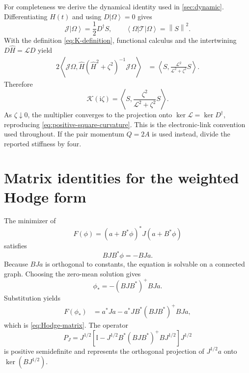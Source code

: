 \documentclass[11pt]{article}
\theoremstyle{definition}
\theoremstyle{remark}
\newcommand{\ket}[1]{\left|#1\right\rangle}
\newcommand{\bra}[1]{\left\langle#1\right|}
\newcommand{\I}{\mathrm i}
\newcommand{\Id}{\mathbb I}
\newcommand{\cL}{\mathcal L}
\newcommand{\cK}{\mathcal K}
\newcommand{\ip}[2]{\left\langle #1,#2\right\rangle}
\newcommand{\norm}[1]{\left\lVert #1\right\rVert}
\begin{document}
For completeness we derive the dynamical identity used in \cref{sec:dynamic}.  Differentiating $H(t)$ and using $D\ket\Omega=0$ gives
\begin{equation}
 \mathcal J\ket\Omega=\frac12D^\dagger S,
 \qquad
 \bra\Omega\mathcal T\ket\Omega=\norm S^2.
 \label{eq:positive-square-current-stress}
\end{equation}
With the definition \eqref{eq:K-definition}, functional calculus and the intertwining $D\widehat H=\cL D$ yield
\begin{align}
 2\ip{\mathcal J\Omega}
 {\widehat H(\widehat H^2+\zeta^2)^{-1}\mathcal J\Omega}
 &=\ip S{\frac{\cL^2}{\cL^2+\zeta^2}S}.
\end{align}
Therefore
\begin{equation}
 \boxed{
 \cK(\I\zeta)=\ip S{\frac{\zeta^2}{\cL^2+\zeta^2}S}.}
 \label{eq:positive-square-dynamical-proof}
\end{equation}
As $\zeta\downarrow0$, the multiplier converges to the projection onto
$\ker\cL=\ker D^\dagger$, reproducing \eqref{eq:positive-square-curvature}.
This is the electronic-link convention used throughout.  If the pair momentum
$Q=2A$ is used instead, divide the reported stiffness by four.

\section{Matrix identities for the weighted Hodge form}
\label{app:matrix}

The minimizer of
\begin{equation}
 F(\phi)=(a+B^*\phi)^*J(a+B^*\phi)
\end{equation}
satisfies
\begin{equation}
 BJB^*\phi=-BJa.
\end{equation}
Because $BJa$ is orthogonal to constants, the equation is solvable on a connected graph.  Choosing the zero-mean solution gives
\begin{equation}
 \phi_*=-(BJB^*)^+BJa.
\end{equation}
Substitution yields
\begin{align}
 F(\phi_*)
 &=a^*Ja-a^*JB^*(BJB^*)^+BJa,
\end{align}
which is \eqref{eq:Hodge-matrix}.  The operator
\begin{equation}
 P_J=J^{1/2}\left[
 \Id-J^{1/2}B^*(BJB^*)^+BJ^{1/2}
 \right]J^{1/2}
\end{equation}
is positive semidefinite and represents the orthogonal projection of $J^{1/2}a$ onto $\ker(BJ^{1/2})$.
\end{document}
